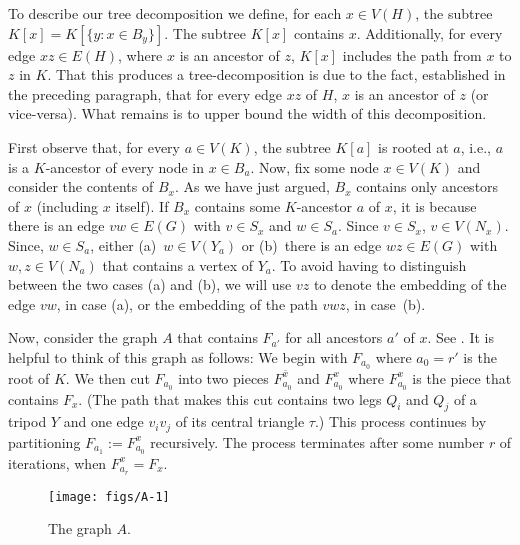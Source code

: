 \documentclass{patmorin}
\begin{document}
To describe our tree decomposition we define, for each $x\in V(H)$, the subtree $K[x]=K[\{y:x\in B_y\}]$.  The subtree $K[x]$ contains $x$.  Additionally, for every edge $xz\in E(H)$, where $x$ is an ancestor of $z$, $K[x]$ includes the path from $x$ to $z$ in $K$.  That this produces a tree-decomposition is due to the fact, established in the preceding paragraph, that for every edge $xz$ of $H$, $x$ is an ancestor of $z$ (or vice-versa).  What remains is to upper bound the width of this decomposition.

First observe that, for every $a\in V(K)$, the subtree $K[a]$ is rooted at $a$, i.e., $a$ is a $K$-ancestor of every node in $x\in B_a$.  Now, fix some node $x\in V(K)$ and consider the contents of $B_x$.  As we have just argued, $B_x$ contains only ancestors of $x$ (including $x$ itself). If $B_x$ contains some $K$-ancestor $a$ of $x$, it is because there is an edge $vw\in E(G)$ with $v\in S_x$ and $w\in S_a$. Since $v\in S_x$, $v\in V(N_x)$. Since, $w\in S_a$, either (a)~$w\in V(Y_a)$ or (b)~there is an edge $wz\in E(G)$ with $w,z\in V(N_a)$ that contains a vertex of $Y_a$.  To avoid having to distinguish between the two cases (a) and (b), we will use $vz$ to denote the embedding of the edge $vw$, in case (a), or the embedding of the path $vwz$, in case~(b). 

Now, consider the graph $A$ that contains $F_{a'}$ for all ancestors $a'$ of $x$. See .  It is helpful to think of this graph as follows:  We begin with $F_{a_0}$ where $a_0=r'$ is the root of $K$.  We then cut $F_{a_0}$ into two pieces $F^{\bar{x}}_{a_0}$ and $F^x_{a_0}$ where $F^x_{a_0}$ is the piece that contains $F_x$. (The path that makes this cut contains two legs $Q_i$ and $Q_j$ of a tripod $Y$ and one edge $v_iv_j$ of its central triangle $\tau$.)  This process continues by partitioning $F_{a_1}:=F^x_{a_0}$ recursively.  The process terminates after some number $r$ of iterations, when $F^x_{a_r}=F_x$.

\begin{figure}
  \begin{center}
      \texttt{[image: figs/A-1]}
  \end{center}
  \caption{The graph $A$.}
\end{figure}
\end{document}
